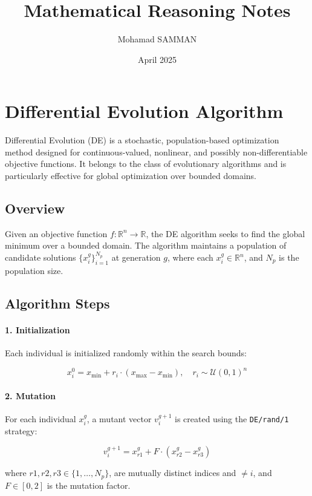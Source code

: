 \documentclass[a4paper]{article}
\title{Mathematical Reasoning Notes}
\author{Mohamad SAMMAN}
\date{April 2025}
\theoremstyle{definition}
\theoremstyle{remark}
\begin{document}
\maketitle

\section{Differential Evolution Algorithm}

Differential Evolution (DE) is a stochastic, population-based optimization method designed for continuous-valued, nonlinear, and possibly non-differentiable objective functions. It belongs to the class of evolutionary algorithms and is particularly effective for global optimization over bounded domains.

\subsection{Overview}

Given an objective function \( f: \mathbb{R}^n \to \mathbb{R} \), the DE algorithm seeks to find the global minimum over a bounded domain. The algorithm maintains a population of candidate solutions \( \{x_i^g\}_{i=1}^{N_p} \) at generation \( g \), where each \( x_i^g \in \mathbb{R}^n \), and \( N_p \) is the population size.

\subsection{Algorithm Steps}

\paragraph{1. Initialization} 

Each individual is initialized randomly within the search bounds:

\[
x_i^0 = x_{\min} + r_i \cdot (x_{\max} - x_{\min}), \quad r_i \sim \mathcal{U}(0, 1)^n
\]

\paragraph{2. Mutation}

For each individual \( x_i^g \), a mutant vector \( v_i^{g+1} \) is created using the \texttt{DE/rand/1} strategy:

\[
v_i^{g+1} = x_{r1}^g + F \cdot (x_{r2}^g - x_{r3}^g)
\]

where \( r1, r2, r3 \in \{1, \ldots, N_p\} \), are mutually distinct indices and \( \ne i \), and \( F \in [0, 2] \) is the mutation factor.
\end{document}

